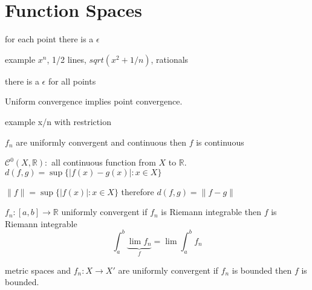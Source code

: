 \chapter{Function Spaces}
\thispagestyle{headings}

\begin{definition}
    for each point there is a \(\epsilon\)
\end{definition}
example \(x^n\), 1/2 lines, \(sqrt(x^2 + 1/n)\), rationals
\begin{definition}
    there is a \(\epsilon\) for all points
\end{definition}
\begin{corollary}
    Uniform convergence implies point convergence.
\end{corollary}
example x/n with restriction
\begin{theorem}
    \(f_n\) are uniformly convergent and continuous then \(f\) is continuous
\end{theorem}

\begin{definition}
    \(\mathcal{C}^0(X,\mathbb{R}):\) all continuous function from \(X \) to \(\mathbb{R}\). \(d(f,g) = \sup{\{|f(x) - g(x)| : x \in X\}}\)
\end{definition}
\begin{definition}
    \(\|f\| = \sup\{|f(x)| : x \in X\}\) therefore \(d(f,g) = \|f - g\|\)
\end{definition}

\begin{theorem}
    \(f_n:[a,b] \to \mathbb{R}\) uniformly convergent if \(f_n\) is Riemann integrable then \(f\) is Riemann integrable
    \[\int_{a}^{b} \underbrace{\lim{f_n}}_{f} = \lim{\int_{a}^{b}{f_n}}\]
\end{theorem}
\begin{lemma}
    metric spaces and \(f_n: X \to X'\) are uniformly convergent if \(f_n\) is bounded then \(f\) is bounded.
\end{lemma}

